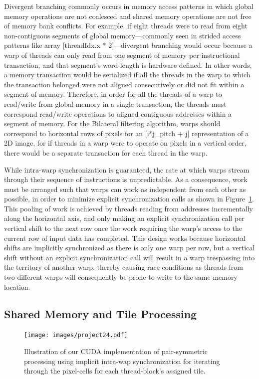 \documentclass{IEEEtran}
\begin{document}
Divergent branching commonly occurs in memory access patterns in which global memory operations are not coalesced and shared memory operations are not free of memory bank conflicts. For example, if eight threads were to read from eight non-contiguous segments of global memory---commonly seen in strided access patterns like array {[}threadIdx.x {*} 2{]}---divergent branching would occur because a warp of threads can only read from one segment of memory per instructional transaction, and that segment's word-length is hardware defined. In other words, a memory transaction would be serialized if all the threads in the warp to which the transaction belonged were not aligned consecutively or did not fit within a segment of memory. Therefore, in order for all the threads of a warp to read/write from global memory in a single transaction, the threads must correspond read/write operations to aligned contiguous addresses within a segment of memory. For the Bilateral filtering algorithm, warps should correspond to horizontal rows of pixels for an [i*j_pitch + j] representation of a 2D image, for if threads in a warp were to operate on pixels in a vertical order, there would be a separate transaction for each thread in the warp.

While intra-warp synchronization is guaranteed, the rate at which warps stream through their sequence of instructions is unpredictable. As a consequence, work must be arranged such that warps can work as independent from each other as possible, in order to minimize explicit synchronization calls as shown in Figure~\ref{fig:pspro}. This pooling of work is achieved by threads reading from addresses incrementally along the horizontal axis, and only making an explicit synchronization call per vertical shift to the next row once the work requiring the warp's access to the current row of input data has completed. This design works because horizontal shifts are implicitly synchronized as there is only one warp per row, but a vertical shift without an explicit synchronization call will result in a warp trespassing into the territory of another warp, thereby causing race conditions as threads from two different warps will consequently be prone to write to the same memory location. 

\subsection{Shared Memory and Tile Processing}
\begin{figure}
\texttt{[image: images/project24.pdf]}
\caption{Illustration of our CUDA implementation of pair-symmetric processing using implicit intra-wap synchronization for iterating through the pixel-cells for each thread-block's assigned tile.}
\label{fig:pspro}
\end{figure}
\end{document}
